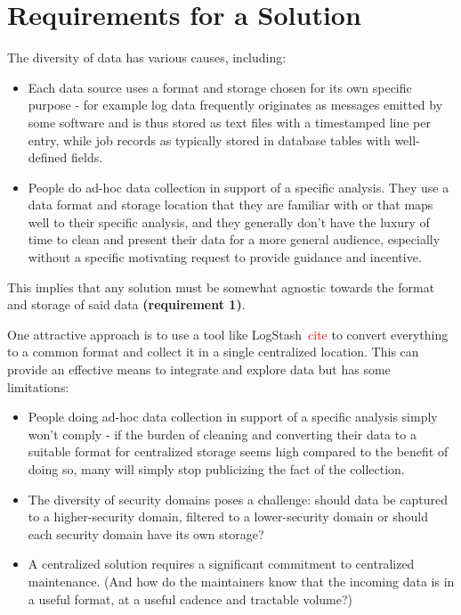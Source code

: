 \section{Requirements for a Solution}
\label{s:requirements}


The diversity of data has various causes, including:

\begin{itemize}
\item Each data source uses a format and storage chosen for its own 
      specific purpose - for example log data frequently originates
      as messages emitted by some software and is thus stored as
      text files with a timestamped line per entry, while job records
      as typically stored in database tables with well-defined fields.
\item People do ad-hoc data collection in support of a specific 
      analysis. They use a data format and storage location that 
      they are familiar with or that maps well to their specific 
      analysis, and they generally don't have the luxury of time to 
      clean and present their data for a more general audience,
      especially without a specific motivating request to provide 
      guidance and incentive.
\end{itemize}

This implies that any solution must be somewhat 
agnostic towards the format and storage of said data \textbf{(requirement 1)}.

One attractive approach is to use a tool like LogStash~\textcolor{red}{cite} 
to convert everything to a common format and collect it in a single 
centralized location. This can provide an effective means to integrate
and explore data but has some limitations:

\begin{itemize}
\item People doing ad-hoc data collection in support of a specific 
      analysis simply won't comply - if the burden of cleaning and 
      converting their data to a suitable format for centralized 
      storage seems high compared to the benefit of doing so, many
      will simply stop publicizing the fact of the collection.
\item The diversity of security domains poses a challenge: should data
      be captured to a higher-security domain, filtered to a lower-security
      domain or should each security domain have its own storage?
\item A centralized solution requires a significant commitment to
      centralized maintenance. (And how do the maintainers know that the 
      incoming data is in a useful format, at a useful cadence and
      tractable volume?)
\end{itemize}

